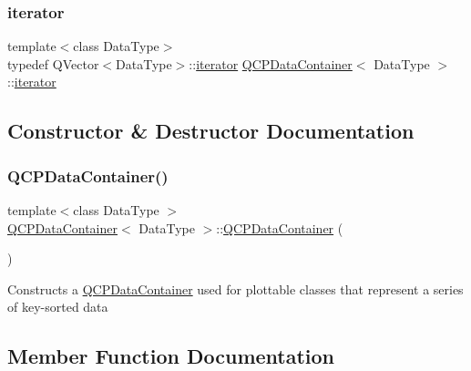 \subsubsection{\texorpdfstring{iterator}{iterator}}
{\footnotesize\ttfamily template$<$class Data\+Type$>$ \\
typedef Q\+Vector$<$Data\+Type$>$\+::\hyperlink{class_q_c_p_data_container_a1bb453c3ae37d1ee5268878acb3a9d29}{iterator} \hyperlink{class_q_c_p_data_container}{Q\+C\+P\+Data\+Container}$<$ Data\+Type $>$\+::\hyperlink{class_q_c_p_data_container_a1bb453c3ae37d1ee5268878acb3a9d29}{iterator}}



\subsection{Constructor \& Destructor Documentation}
\mbox{\label{class_q_c_p_data_container_af86c0c63719f92c360ff67cc06c6fe6f}} 
\subsubsection{\texorpdfstring{Q\+C\+P\+Data\+Container()}{QCPDataContainer()}}
{\footnotesize\ttfamily template$<$class Data\+Type $>$ \\
\hyperlink{class_q_c_p_data_container}{Q\+C\+P\+Data\+Container}$<$ Data\+Type $>$\+::\hyperlink{class_q_c_p_data_container}{Q\+C\+P\+Data\+Container} (\begin{DoxyParamCaption}{ }\end{DoxyParamCaption})}

Constructs a \hyperlink{class_q_c_p_data_container}{Q\+C\+P\+Data\+Container} used for plottable classes that represent a series of key-\/sorted data 

\subsection{Member Function Documentation}
\mbox{\label{class_q_c_p_data_container_a42b98bd994307ccd163a43d576f91ad9}} 
